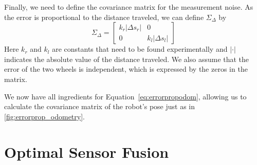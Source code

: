 Finally, we need to define the covariance matrix for the measurement noise. As the error is proportional to the distance traveled, we can define $ \Sigma_{\Delta}$ by
\begin{equation}
\Sigma_{\Delta}=\left[\begin{array}{cc}k_r|\Delta s_r| & 0\\0 & k_l|\Delta s_l|\end{array}\right]
\end{equation}
Here $ k_r$ and $ k_l$ are constants that need to be found experimentally and $ |\cdot |$ indicates the absolute value of the distance traveled. We also assume that the error of the two wheels is independent, which is expressed by the zeros in the matrix.

We now have all ingredients for Equation~\ref{eq:errorpropodom}, allowing us to calculate the covariance matrix of the robot's pose just as in \cref{fig:errorprop_odometry}.






\section{Optimal Sensor Fusion}


